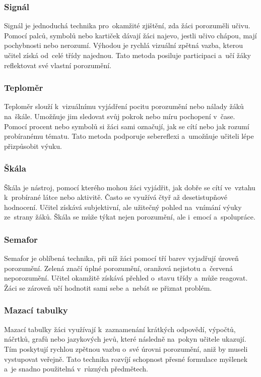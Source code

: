\documentclass[male,czech,api_bc]{kitheses}
\begin{document}
\subsubsection{Signál}

Signál je jednoduchá technika pro~okamžité zjištění, zda žáci porozuměli učivu. Pomocí palců, symbolů nebo kartiček dávají žáci najevo, jestli učivo chápou, mají pochybnosti nebo nerozumí. Výhodou je rychlá vizuální zpětná vazba, kterou učitel získá od~celé třídy najednou. Tato metoda posiluje participaci a~učí žáky reflektovat své vlastní porozumění.

\subsubsection{Teploměr}

Teploměr slouží k~vizuálnímu vyjádření pocitu porozumění nebo nálady žáků na~škále. Umožňuje jim sledovat svůj pokrok nebo míru pochopení v~čase. Pomocí procent nebo symbolů si žáci sami označují, jak se cítí nebo jak rozumí probíranému tématu. Tato metoda podporuje sebereflexi a~umožňuje učiteli lépe přizpůsobit výuku.

\subsubsection{Škála}

Škála je nástroj, pomocí kterého mohou žáci vyjádřit, jak dobře se cítí ve~vztahu k~probírané látce nebo aktivitě. Často se využívá čtyř až desetistupňové hodnocení. Učitel získává subjektivní, ale užitečný pohled na~vnímání výuky ze~strany žáků. Škála se může týkat nejen porozumění, ale i~emocí a~spolupráce.

\subsubsection{Semafor}

Semafor je oblíbená technika, při níž žáci pomocí tří barev vyjadřují úroveň porozumění. Zelená značí úplné porozumění, oranžová nejistotu a~červená neporozumění. Učitel okamžitě získává přehled o~stavu třídy a~může reagovat. Žáci se zároveň učí hodnotit sami sebe a~nebát se přiznat problém.

\subsubsection{Mazací tabulky}

Mazací tabulky žáci využívají k~zaznamenání krátkých odpovědí, výpočtů, náčrtků, grafů nebo jazykových jevů, které následně na~pokyn učitele ukazují. Tím poskytují rychlou zpětnou vazbu o~své úrovni porozumění, aniž by museli vystupovat veřejně. Tato technika rozvíjí schopnost přesné formulace myšlenek a~je snadno použitelná v~různých předmětech.
\end{document}
